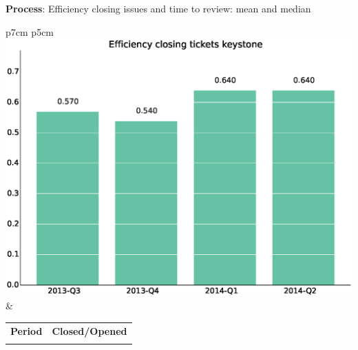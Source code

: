 \documentclass[a4wide,11pt]{report}
\begin{document}
\textbf{Process}: Efficiency closing issues and time to review: mean and median

\begin{tabular}{p{7cm} p{5cm}}
    \vspace{0pt} 
    \includegraphics[scale=.35]{figs/bmikeystone.eps}
    & 
    \vspace{0pt}
    \begin{tabular}{l|l}%
    \bfseries Period & \bfseries Closed/Opened %
    \csvreader[head to column names]{data/bmikeystone.csv}{}%
    {\\ & \bmi}
    \end{tabular}
\end{tabular}
\end{document}
